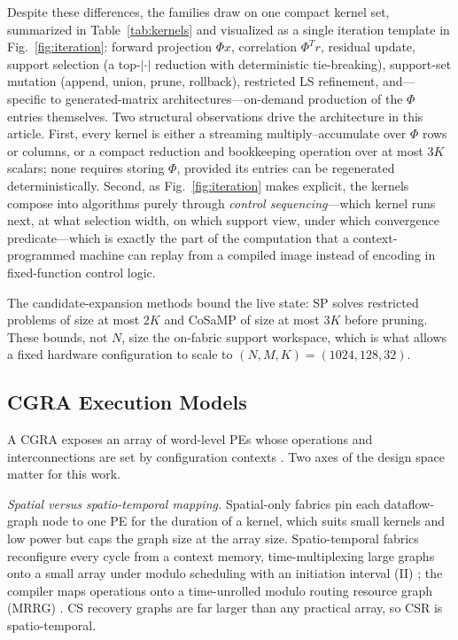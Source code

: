

Despite these differences, the families draw on one compact kernel set,
summarized in Table~\ref{tab:kernels} and visualized as a single iteration
template in Fig.~\ref{fig:iteration}: forward projection $\Phi x$,
correlation $\Phi^{T} r$, residual update, support selection (a top-$|{\cdot}|$
reduction with deterministic tie-breaking), support-set mutation
(append, union, prune, rollback), restricted LS refinement, and---specific
to generated-matrix architectures---on-demand production of the $\Phi$
entries themselves. Two structural observations drive the architecture in
this article. First, every kernel is either a streaming
multiply--accumulate over $\Phi$ rows or columns, or a compact reduction and
bookkeeping operation over at most $3K$ scalars; none requires storing
$\Phi$, provided its entries can be regenerated deterministically. Second,
as Fig.~\ref{fig:iteration} makes explicit, the kernels compose into
algorithms purely through \emph{control sequencing}---which kernel runs
next, at what selection width, on which support view, under which
convergence predicate---which is exactly the part of the computation that a
context-programmed machine can replay from a compiled image instead of
encoding in fixed-function control logic.


The candidate-expansion methods bound the live state: SP solves restricted
problems of size at most $2K$ and CoSaMP of size at most $3K$ before
pruning. These bounds, not $N$, size the on-fabric support workspace, which
is what allows a fixed hardware configuration to scale to
$(N,M,K)=(1024,128,32)$.

\subsection{CGRA Execution Models}
\label{sec:background_cgra}

A CGRA exposes an array of word-level PEs whose operations and
interconnections are set by configuration contexts
\cite{liu2019cgra_survey}. Two axes of the design space matter for this
work.

\emph{Spatial versus spatio-temporal mapping.} Spatial-only fabrics pin each
dataflow-graph node to one PE for the duration of a kernel, which suits
small kernels and low power but caps the graph size at the array size.
Spatio-temporal fabrics reconfigure every cycle from a context memory,
time-multiplexing large graphs onto a small array under modulo scheduling
with an initiation interval (II) \cite{mei2003adres}; the compiler maps
operations onto a time-unrolled modulo routing resource graph (MRRG)
\cite{ragheb2024cgrame2, wijerathne2022morpher}. CS recovery graphs are far
larger than any practical array, so CSR is spatio-temporal.

